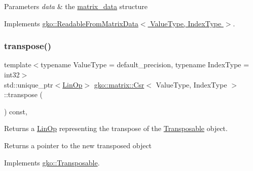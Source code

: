 \begin{DoxyParams}{Parameters}
{\em data} & the \hyperlink{structgko_1_1matrix__data}{matrix\+\_\+data} structure \\
\hline
\end{DoxyParams}


Implements \hyperlink{classgko_1_1ReadableFromMatrixData_add5c12e23b3ac3c8fbd607fa5a9656bb}{gko\+::\+Readable\+From\+Matrix\+Data$<$ Value\+Type, Index\+Type $>$}.

\mbox{\label{classgko_1_1matrix_1_1Csr_ab79e609214d6b4834d5961ee0a7d3519}} 
\subsubsection{\texorpdfstring{transpose()}{transpose()}}
{\footnotesize\ttfamily template$<$typename Value\+Type = default\+\_\+precision, typename Index\+Type = int32$>$ \\
std\+::unique\+\_\+ptr$<$\hyperlink{classgko_1_1LinOp}{Lin\+Op}$>$ \hyperlink{classgko_1_1matrix_1_1Csr}{gko\+::matrix\+::\+Csr}$<$ Value\+Type, Index\+Type $>$\+::transpose (\begin{DoxyParamCaption}{ }\end{DoxyParamCaption}) const\hspace{0.3cm}{\ttfamily [override]}, {\ttfamily [virtual]}}



Returns a \hyperlink{classgko_1_1LinOp}{Lin\+Op} representing the transpose of the \hyperlink{classgko_1_1Transposable}{Transposable} object. 

\begin{DoxyReturn}{Returns}
a pointer to the new transposed object 
\end{DoxyReturn}


Implements \hyperlink{classgko_1_1Transposable_a5c6b778b71b47d53e0bda6ccf894d318}{gko\+::\+Transposable}.

\mbox{\label{classgko_1_1matrix_1_1Csr_a205fc391f4cf4f7718a55b0a61f62bc9}} 
